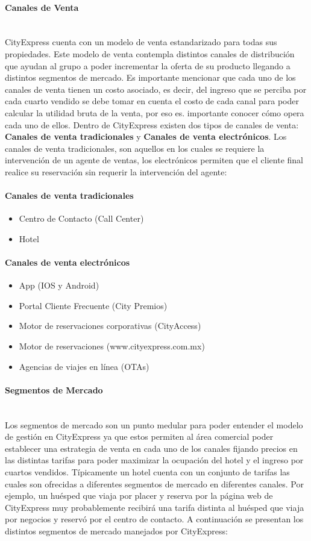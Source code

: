 \documentclass[a4paper,11pt]{article}
\begin{document}
\paragraph{Canales de Venta} ~\\
CityExpress cuenta con un modelo de venta estandarizado para todas sus propiedades. Este modelo de venta contempla distintos canales de distribución que ayudan al grupo a poder incrementar la oferta de su producto llegando a distintos segmentos de mercado.
Es importante mencionar que cada uno de los canales de venta tienen un costo asociado, es decir, del ingreso que se perciba por cada cuarto vendido se debe tomar en cuenta el costo de cada canal para poder calcular la utilidad bruta de la venta, por eso es. importante conocer cómo opera cada uno de ellos.
Dentro de CityExpress existen dos tipos de canales de venta: \textbf{Canales de venta tradicionales} y \textbf{Canales de venta electrónicos}. Los canales de venta tradicionales, son aquellos en los cuales se requiere la intervención de un agente de ventas, los electrónicos permiten que el cliente final realice su reservación sin requerir la intervención del agente:
\paragraph{\textbf{Canales de venta tradicionales}}
\begin{itemize}[noitemsep]
\item Centro de Contacto (Call Center)
\item Hotel
\end{itemize}
\paragraph{\textbf{Canales de venta electrónicos}}
\begin{itemize}[noitemsep]
\item App (IOS y Android)
\item Portal Cliente Frecuente (City Premios)
\item Motor de reservaciones corporativas (CityAccess)
\item Motor de reservaciones (www.cityexpress.com.mx)
\item Agencias de viajes en línea (OTAs)
\end{itemize}
\paragraph{Segmentos de Mercado} ~\\
Los segmentos de mercado son un punto medular para poder entender el modelo de gestión en CityExpress ya que estos permiten al área comercial poder establecer una estrategia de venta en cada uno de los canales fijando precios en las distintas tarifas para poder maximizar la ocupación del hotel y el ingreso por cuartos vendidos. 
Típicamente un hotel cuenta con un conjunto de tarifas las cuales son ofrecidas a diferentes segmentos de mercado en diferentes canales. Por ejemplo, un huésped que viaja por placer y reserva por la página web de CityExpress muy probablemente recibirá una tarifa distinta al huésped que viaja por negocios y reservó por el centro de contacto.
A continuación se presentan los distintos segmentos de mercado manejados por CityExpress:
\end{document}
